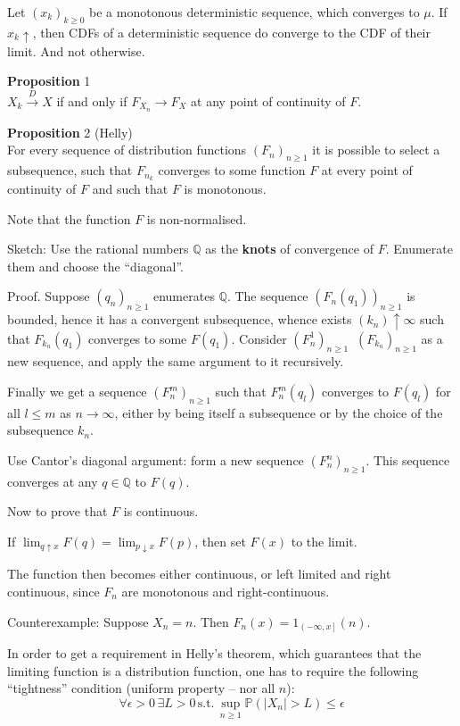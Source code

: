 \documentclass[a4paper]{article}
\newcommand{\ploc}[1]{{\left ( #1 \right ]}}
\newcommand{\brac}[1]{{\left ( #1 \right )}}
\newcommand{\abs}[1]{{\left | #1 \right |}}
\newcommand{\pr}{\mathbb{P}}
\newcommand{\defn}{\mathop{\overset{\Delta}{=}}\nolimits}
\begin{document}
Let $\brac{x_k}_{k\geq0}$ be a monotonous deterministic sequence, which converges to $\mu$.
If $x_k\uparrow$, then CDFs of a deterministic sequence do converge to the CDF of their limit. And not otherwise.

\noindent \textbf{Proposition} 1\hfill \\
$X_k\overset{D}{\to}X$ if and only if $F_{X_n}\to F_X$ at any point of continuity of $F$.

\noindent \textbf{Proposition} 2 (Helly)\hfill \\
For every sequence of distribution functions $\brac{F_n}_{n\geq1}$ it is possible to select a subsequence, such that $F_{n_k}$ converges to some function $F$ at every point of continuity of $F$ and such that $F$ is monotonous.

Note that the function $F$ is non-normalised.

Sketch:
Use the rational numbers $\mathbb{Q}$ as the \textbf{knots} of convergence of $F$. Enumerate them and choose the ``diagonal''.

Proof. Suppose $\brac{q_n}_{n\geq 1}$ enumerates $\mathbb{Q}$.
The sequence $\brac{F_n(q_1)}_{n\geq1}$ is bounded, hence it has a convergent subsequence, whence exists $\brac{k_n}\uparrow\infty$ such that $F_{k_n}(q_1)$ converges to some $F(q_1)$.
Consider $\brac{F^1_n}_{n\geq 1}\defn\brac{F_{k_n}}_{n\geq1}$ as a new sequence, and apply the same argument to it recursively.

Finally we get a sequence $\brac{F^m_n}_{n\geq1}$ such that $F^m_n(q_l)$ converges to $F(q_l)$ for all $l\leq m$ as $n\to \infty$, either by being itself a subsequence or by the choice of the subsequence $k_n$.

Use Cantor's diagonal argument: form a new sequence $\brac{F^n_n}_{n\geq1}$. This sequence converges at any $q\in\mathbb{Q}$ to $F(q)$.

Now to prove that $F$ is continuous.

If $\lim_{q\uparrow x}F(q) = \lim_{p\downarrow x}F(p)$, then set $F(x)$ to the limit.

The function then becomes either continuous, or left limited and right continuous, since $F_n$ are monotonous and right-continuous.

Counterexample:
Suppose $X_n=n$. Then $F_n(x) = 1_{\ploc{-\infty, x}}(n)$.

In order to get a requirement in Helly's theorem, which guarantees that the limiting function is a distribution function, one has to require the following ``tightness'' condition (uniform property -- nor all $n$):
\[\forall \epsilon>0\,\exists L>0\,\text{s.t.}\,\sup_{n\geq1}\pr\brac{\abs{X_n}>L}\leq \epsilon\]
\end{document}
